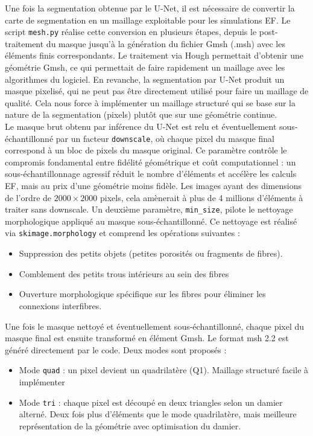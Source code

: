 \documentclass[a4paper,11pt]{article}
\begin{document}
Une fois la segmentation obtenue par le U-Net, il est nécessaire de convertir la carte de segmentation en un maillage exploitable pour les simulations EF. Le script \texttt{mesh.py} réalise cette conversion en plusieurs étapes, depuis le post-traitement du masque jusqu'à la génération du fichier Gmsh (.msh) avec les éléments finis correspondants. Le traitement via Hough permettait d'obtenir une géométrie Gmsh, ce qui permettait de faire rapidement un maillage avec les algorithmes du logiciel. En revanche, la segmentation par U-Net produit un masque pixelisé, qui ne peut pas être directement utilisé pour faire un maillage de qualité. Cela nous force à implémenter un maillage structuré qui se base sur la nature de la segmentation (pixels) plutôt que sur une géométrie continue. \\

Le masque brut obtenu par inférence du U-Net est relu et éventuellement sous-échantillonné par un facteur \texttt{downscale}, où chaque pixel du masque final correspond à un bloc de pixels du masque original. Ce paramètre contrôle le compromis fondamental entre fidélité géométrique et coût computationnel : un sous-échantillonnage agressif réduit le nombre d'éléments et accélère les calculs EF, mais au prix d'une géométrie moins fidèle. Les images ayant des dimensions de l'ordre de $2000\times2000$ pixels, cela amènerait à plus de 4 millions d'éléments à traiter sans downscale. Un deuxième paramètre, \texttt{min\_size}, pilote le nettoyage morphologique appliqué au masque sous-échantillonné. Ce nettoyage est réalisé via \texttt{skimage.morphology} et comprend les opérations suivantes :
\begin{itemize}
    \item Suppression des petits objets (petites porosités ou fragments de fibres).
    \item Comblement des petits trous intérieurs au sein des fibres
    \item Ouverture morphologique spécifique sur les fibres pour éliminer les connexions interfibres.
\end{itemize}

\vspace{0.1cm}
Une fois le masque nettoyé et éventuellement sous-échantillonné, chaque pixel du masque final est ensuite transformé en élément Gmsh. Le format msh 2.2 est généré directement par le code. Deux modes sont proposés : 
\begin{itemize}
    \item Mode \texttt{quad} : un pixel devient un quadrilatère (Q1). Maillage structuré facile à implémenter 
    \item Mode \texttt{tri} : chaque pixel est découpé en deux triangles selon un damier alterné. Deux fois plus d'éléments que le mode quadrilatère, mais meilleure représentation de la géométrie avec optimisation du damier.
\end{itemize}
\end{document}
